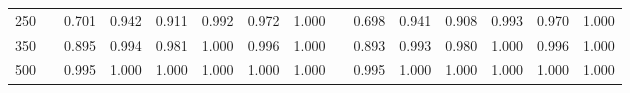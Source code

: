 % 
\begin{tabular}{ccccccccccccccc}
  \hline
  \hline
250 &  & 0.701 & 0.942 & 0.911 & 0.992 & 0.972 & 1.000 &  & 0.698 & 0.941 & 0.908 & 0.993 & 0.970 & 1.000 \\ 
  350 &  & 0.895 & 0.994 & 0.981 & 1.000 & 0.996 & 1.000 &  & 0.893 & 0.993 & 0.980 & 1.000 & 0.996 & 1.000 \\ 
  500 &  & 0.995 & 1.000 & 1.000 & 1.000 & 1.000 & 1.000 &  & 0.995 & 1.000 & 1.000 & 1.000 & 1.000 & 1.000 \\ 
   \hline
\end{tabular}
